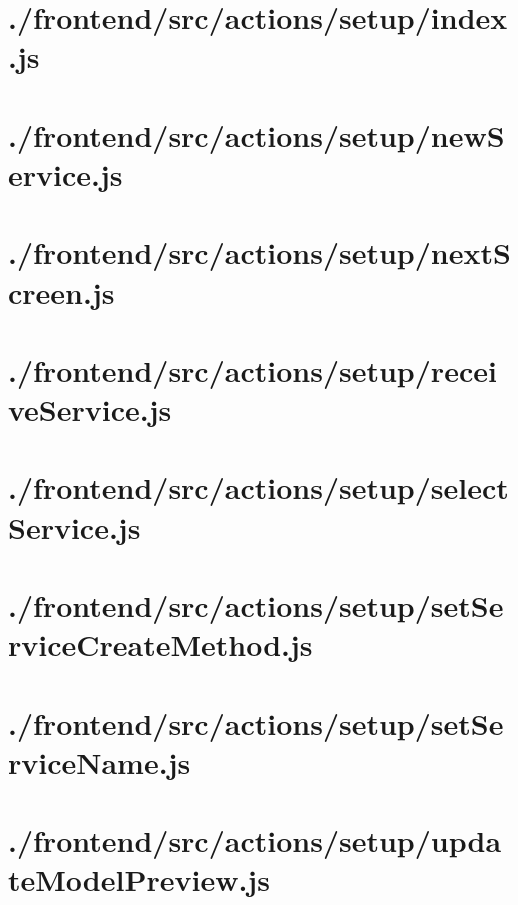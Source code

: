 \documentclass[11pt]{informatics-report}
\begin{document}
\newpage
\section{./frontend/src/actions/setup/index.js}


\newpage
\section{./frontend/src/actions/setup/newService.js}


\newpage
\section{./frontend/src/actions/setup/nextScreen.js}


\newpage
\section{./frontend/src/actions/setup/receiveService.js}


\newpage
\section{./frontend/src/actions/setup/selectService.js}


\newpage
\section{./frontend/src/actions/setup/setServiceCreateMethod.js}


\newpage
\section{./frontend/src/actions/setup/setServiceName.js}


\newpage
\section{./frontend/src/actions/setup/updateModelPreview.js}

\end{document}
